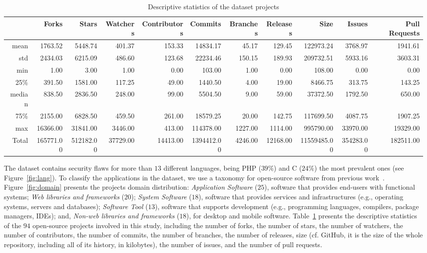 \documentclass[10pt,conference]{IEEEtran}
\begin{document}
\begin{table}[h]
	\centering
	\caption{Descriptive statistics of the dataset projects}
\begin{tabular}{@{}rrrrrrrrrrr@{}}
\toprule
      & Forks   & Stars   & Watchers & Contributors & Commits  & Branches & Releases & Size      & Issues & Pull Requests  \\ \midrule
mean  & 1763.52 & 5448.74 & 401.37   & 153.33       & 14834.17 & 45.17    & 129.45   & 122973.24 & 3768.97   & 1941.61 \\
std   & 2434.03 & 6215.09 & 486.60   & 123.68       & 22234.46 & 150.15   & 189.93   & 209732.51 & 5933.16   & 3603.31 \\
min   & 1.00       & 3.00       & 1.00        & 0.00            & 103.00      & 1.00        & 0.00        & 108.00       & 0.00         & 0.00       \\
25\%  & 391.50  & 1581.00    & 117.25   & 49.00           & 1440.50  & 4.00        & 19.00       & 8466.75   & 313.75    & 143.25  \\
median  & 838.50  & 2836.50 & 248.00      & 99.00           & 5504.50  & 9.00        & 59.00       & 37372.50  & 1792.50   & 650.00     \\
75\%  & 2155.00    & 6828.50 & 459.50   & 261.00          & 18579.25 & 20.00       & 142.75   & 117699.50 & 4087.75   & 1907.25 \\
max   & 16366.00   & 31841.00   & 3446.00     & 413.00          & 114378.00   & 1227.00     & 1114.00     & 995790.00    & 33970.00     & 19329.00   \\
Total & 165771.00  & 512182.00  & 37729.00    & 14413.00        & 1394412.00  & 4246.00     & 12168.00    & 11559485.00  & 354283.00    & 182511.00  \\ \bottomrule
\end{tabular}
\label{tab:dataset}
\end{table}

The dataset contains security flaws for more than $13$ different languages,
being PHP ($39\%$) and C ($24\%$) the most prevalent ones (see Figure~\ref{fig:lang}).
To classify the applications in the dataset, we use a taxonomy for open-source
software from previous work~\cite{7816479}. Figure~\ref{fig:domain}
presents the projects domain distribution: \textit{Application Software} ($25$),
software that provides end-users with functional systems; \textit{Web libraries
and frameworks} ($20$); \textit{System Software} ($18$), software that provides
services and infrastructures (e.g., operating systems, servers and databases);
\textit{Software Tool} ($13$), software that supports development (e.g.,
programming languages, compilers, package managers, IDEs); and, \textit{Non-web
libraries and frameworks} ($18$), for desktop and mobile software.
%
Table~\ref{tab:dataset} presents the descriptive statistics of the $94$
open-source projects involved in this study, including the number of forks, the
number of stars, the number of watchers, the number of contributors, the number
of commits, the number of branches, the number of releases,  size (cf. GitHub, it
is the size of the whole repository, including all of its history, in
kilobytes), the number of issues, and the number of pull requests.
\end{document}
